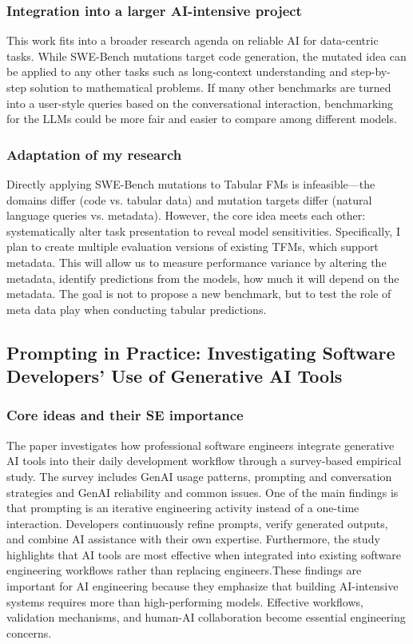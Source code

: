 \documentclass[11pt]{article}
\begin{document}
\subsubsection{Integration into a larger AI-intensive project}

This work fits into a broader research agenda on reliable AI for data-centric tasks. While SWE-Bench mutations target code generation, the mutated idea can be applied to any other tasks such as long-context understanding and step-by-step solution to mathematical problems. If many other benchmarks are turned into a user-style queries based on the conversational interaction, benchmarking for the LLMs could be more fair and easier to compare among different models. 

\subsubsection{Adaptation of my research}

Directly applying SWE-Bench mutations to Tabular FMs is infeasible—the domains differ (code vs. tabular data) and mutation targets differ (natural language queries vs. metadata). However, the core idea meets each other: systematically alter task presentation to reveal model sensitivities. Specifically, I plan to create multiple evaluation versions of existing TFMs, which support metadata. This will allow us to measure performance variance by altering the metadata, identify predictions from the models, how much it will depend on the metadata.  The goal is not to propose a new benchmark, but to test the role of meta data play when conducting tabular predictions. 





\subsection{Prompting in Practice: Investigating Software Developers’ Use of Generative AI Tools}

\subsubsection{Core ideas and their SE importance}
The paper investigates how professional software engineers integrate generative AI tools into their daily development workflow through a survey-based empirical study. The survey includes GenAI usage patterns, prompting and conversation strategies and GenAI reliability and common issues\cite{otten2025prompting}. One of the main findings is that prompting is an iterative engineering activity instead of a one-time interaction. Developers continuously refine prompts, verify generated outputs, and combine AI assistance with their own expertise. Furthermore, the study highlights that AI tools are most effective when integrated into existing software engineering workflows rather than replacing engineers.These findings are important for AI engineering because they emphasize that building AI-intensive systems requires more than high-performing models. Effective workflows, validation mechanisms, and human-AI collaboration become essential engineering concerns.
\end{document}
